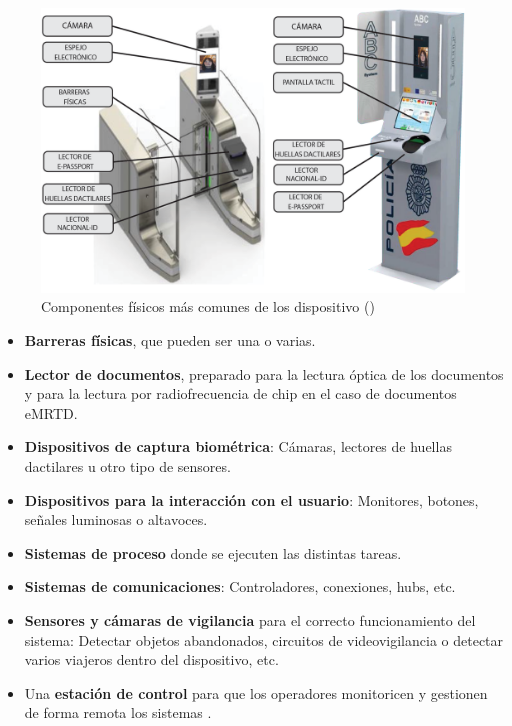 \begin{figure}
    \centering
    \includegraphics[width=1\textwidth]{ch-sistemasABC/images/ch-SistemasABC/ELEMENTOS_FISICOS_SISTEMAS_ABC.png}
    \caption{Componentes físicos más comunes de los dispositivo  (\cite{ICAOOnline})}
    \label{fig:ElementosFisicosABC}
\end{figure}

\begin{itemize}
\item 
\textbf{Barreras físicas}, que pueden ser una o varias.

\item
\textbf{Lector de documentos}, preparado para la lectura óptica de los documentos y para la lectura por radiofrecuencia de chip en el caso de documentos \gls{eMRTD}.

\item
\textbf{Dispositivos de captura biométrica}: Cámaras, lectores de huellas dactilares u otro tipo de sensores.

\item
\textbf{Dispositivos para la interacción con el usuario}: Monitores, botones, señales luminosas o altavoces.

\item
\textbf{Sistemas de proceso} donde se ejecuten las distintas tareas. 

\item
\textbf{Sistemas de comunicaciones}: Controladores, conexiones, hubs, etc.

\item
\textbf{Sensores y cámaras de vigilancia} para el correcto funcionamiento del sistema: Detectar objetos abandonados, circuitos de videovigilancia o detectar varios viajeros dentro del dispositivo, etc.  

\item
Una \textbf{estación de control} para que los operadores monitoricen y gestionen de forma remota los sistemas .
\end{itemize}

